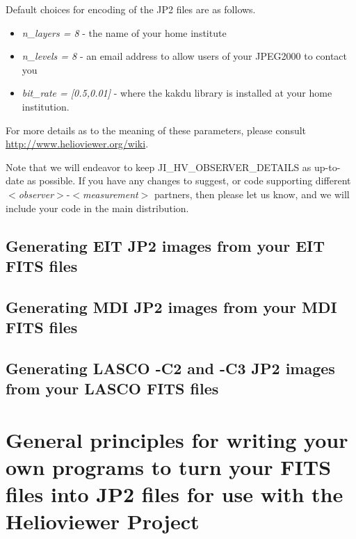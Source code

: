 \documentclass[namedreferences]{SolarPhysics}
\newcommand{\cvar}[1]{$<${\it #1}$>$}
\begin{document}
\begin{article}
Default choices for encoding of the JP2 files are as follows.

\begin{itemize}
\item {\it n\_layers = 8}  - the name of your home institute

\item  {\it n\_levels = 8 } - an email address to allow users of your
  JPEG2000 to contact you

\item  {\it bit\_rate = [0.5,0.01] } - where the kakdu library is installed
  at your home institution.

\end{itemize}
For more details as to the meaning of these parameters, please consult
\url{http://www.helioviewer.org/wiki}. 

Note that we will endeavor to keep JI\_HV\_OBSERVER\_DETAILS as
up-to-date as possible.  If you have any changes to suggest, or code
supporting different \cvar{observer}-\cvar{measurement} partners, then
please let us know, and we will include your code in the main distribution.


\subsection{Generating EIT JP2 images from your EIT FITS files}




\subsection{Generating MDI JP2 images from your MDI FITS files}

\subsection{Generating LASCO -C2 and -C3 JP2 images from your LASCO FITS files}



\section{General principles for writing your own programs to turn your
  FITS files into JP2 files for use with the Helioviewer Project}


\end{article}
\end{document}
